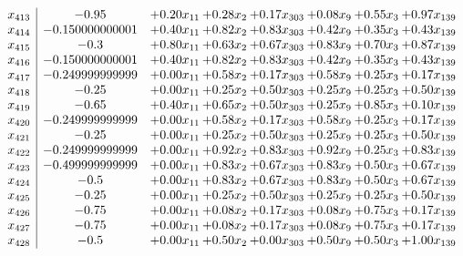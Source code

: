 \documentclass[8pt]{article}
\begin{document}
\[\begin{array}{c| c c@{\hskip 2pt} c@{\hskip 2pt} c@{\hskip 2pt} c@{\hskip 2pt} c@{\hskip 2pt} c@{\hskip 2pt} }
 x_{413}   &  -0.95 & +  0.20 x_{11} & +  0.28 x_{2} & +  0.17 x_{303} & +  0.08 x_{9} & +  0.55 x_{3} & +  0.97 x_{139}\\
 x_{414}   &  -0.150000000001 & +  0.40 x_{11} & +  0.82 x_{2} & +  0.83 x_{303} & +  0.42 x_{9} & +  0.35 x_{3} & +  0.43 x_{139}\\
 x_{415}   &  -0.3 & +  0.80 x_{11} & +  0.63 x_{2} & +  0.67 x_{303} & +  0.83 x_{9} & +  0.70 x_{3} & +  0.87 x_{139}\\
 x_{416}   &  -0.150000000001 & +  0.40 x_{11} & +  0.82 x_{2} & +  0.83 x_{303} & +  0.42 x_{9} & +  0.35 x_{3} & +  0.43 x_{139}\\
 x_{417}   &  -0.249999999999 & +  0.00 x_{11} & +  0.58 x_{2} & +  0.17 x_{303} & +  0.58 x_{9} & +  0.25 x_{3} & +  0.17 x_{139}\\
 x_{418}   &  -0.25 & +  0.00 x_{11} & +  0.25 x_{2} & +  0.50 x_{303} & +  0.25 x_{9} & +  0.25 x_{3} & +  0.50 x_{139}\\
 x_{419}   &  -0.65 & +  0.40 x_{11} & +  0.65 x_{2} & +  0.50 x_{303} & +  0.25 x_{9} & +  0.85 x_{3} & +  0.10 x_{139}\\
 x_{420}   &  -0.249999999999 & +  0.00 x_{11} & +  0.58 x_{2} & +  0.17 x_{303} & +  0.58 x_{9} & +  0.25 x_{3} & +  0.17 x_{139}\\
 x_{421}   &  -0.25 & +  0.00 x_{11} & +  0.25 x_{2} & +  0.50 x_{303} & +  0.25 x_{9} & +  0.25 x_{3} & +  0.50 x_{139}\\
 x_{422}   &  -0.249999999999 & +  0.00 x_{11} & +  0.92 x_{2} & +  0.83 x_{303} & +  0.92 x_{9} & +  0.25 x_{3} & +  0.83 x_{139}\\
 x_{423}   &  -0.499999999999 & +  0.00 x_{11} & +  0.83 x_{2} & +  0.67 x_{303} & +  0.83 x_{9} & +  0.50 x_{3} & +  0.67 x_{139}\\
 x_{424}   &  -0.5 & +  0.00 x_{11} & +  0.83 x_{2} & +  0.67 x_{303} & +  0.83 x_{9} & +  0.50 x_{3} & +  0.67 x_{139}\\
 x_{425}   &  -0.25 & +  0.00 x_{11} & +  0.25 x_{2} & +  0.50 x_{303} & +  0.25 x_{9} & +  0.25 x_{3} & +  0.50 x_{139}\\
 x_{426}   &  -0.75 & +  0.00 x_{11} & +  0.08 x_{2} & +  0.17 x_{303} & +  0.08 x_{9} & +  0.75 x_{3} & +  0.17 x_{139}\\
 x_{427}   &  -0.75 & +  0.00 x_{11} & +  0.08 x_{2} & +  0.17 x_{303} & +  0.08 x_{9} & +  0.75 x_{3} & +  0.17 x_{139}\\
 x_{428}   &  -0.5 & +  0.00 x_{11} & +  0.50 x_{2} & +  0.00 x_{303} & +  0.50 x_{9} & +  0.50 x_{3} & +  1.00 x_{139}\\

\end{array}\]
\end{document}
